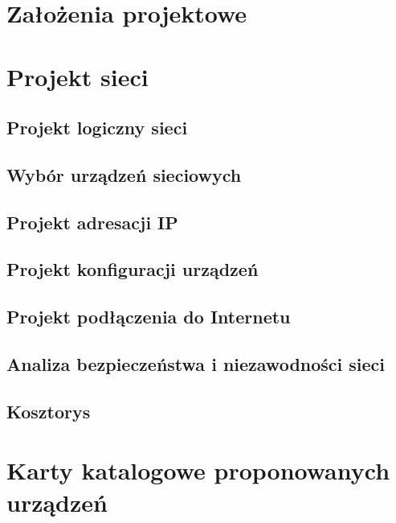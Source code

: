 \documentclass{article}
\begin{document}
\section{Założenia projektowe}

\newpage
\section{Projekt sieci}

\subsection{Projekt logiczny sieci}

\subsection{Wybór urządzeń sieciowych}

\subsection{Projekt adresacji IP}

\subsection{Projekt konfiguracji urządzeń}

\subsection{Projekt podłączenia do Internetu}

\subsection{Analiza bezpieczeństwa i niezawodności sieci}

\subsection{Kosztorys}

\newpage
\section{Karty katalogowe proponowanych urządzeń}
\end{document}
